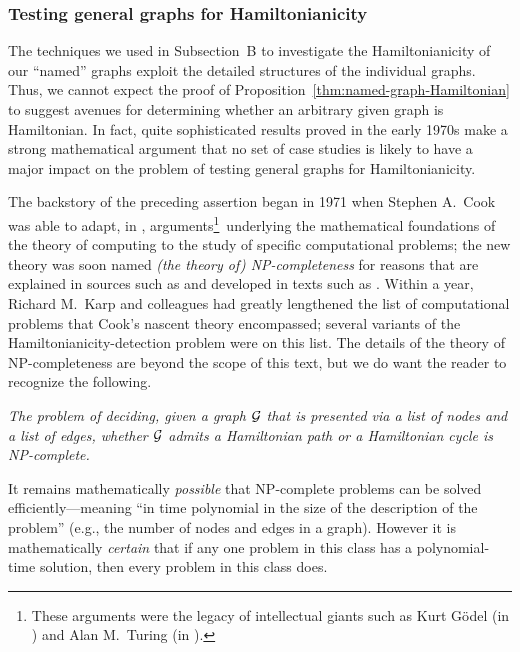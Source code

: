\subsubsection{Testing general graphs for Hamiltonianicity}

The techniques we used in Subsection~{\small\sf B} to investigate the
Hamiltonianicity of our ``named'' graphs exploit the detailed
structures of the individual graphs.  Thus, we cannot expect the proof
of Proposition~\ref{thm:named-graph-Hamiltonian} to suggest avenues
for determining whether an arbitrary given graph is Hamiltonian.  In
fact, quite sophisticated results proved in the early 1970s make a
strong mathematical argument that no set of case studies is likely to
have a major impact on the problem of testing general graphs for
Hamiltonianicity.

The backstory of the preceding assertion began in 1971 when Stephen
A.~Cook  was able to adapt, in \cite{Cook71},
arguments\footnote{These arguments were the legacy of intellectual
  giants such as Kurt G\"{o}del  (in
  \cite{Goedel31}) and Alan M.~Turing  (in
  \cite{Turing36}).}~underlying the mathematical foundations of the
theory of computing to the study of specific computational problems;
the new theory was soon named {\it (the theory of) {\sf
    NP}-completeness}  for reasons that
are explained in sources such as  and developed in
texts such as .  Within a year, Richard M.~Karp
 and colleagues had greatly lengthened the
list of computational problems that Cook's nascent theory encompassed;
several variants of the Hamiltonianicity-detection problem were on
this list.  The details of the theory of {\sf NP}-completeness are
beyond the scope of this text, but we do want the reader to recognize
the following.
\begin{description}
\item
{\it The problem of deciding, given a graph $\mbox{$\cal G$}$ that is presented via
  a list of nodes and a list of edges, whether $\mbox{$\cal G$}$ admits a
  Hamiltonian path or a Hamiltonian cycle is {\sf NP}-complete.}
\end{description}
It remains mathematically {\em possible} that {\sf NP}-complete
problems can be solved efficiently---meaning ``in time polynomial in
the size of the description of the problem'' (e.g., the number of
nodes and edges in a graph).  However it is mathematically {\em
  certain} that if any one problem in this class has a polynomial-time
solution, then every problem in this class does.

